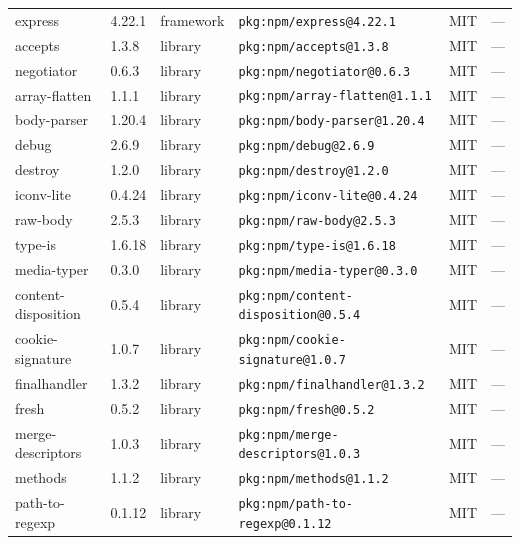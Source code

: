 \documentclass[11pt,a4paper]{article}
\begin{document}
\begin{longtable}{|p{4cm}|p{2cm}|p{1.6cm}|p{5cm}|p{1.5cm}|p{3.5cm}|}
\raggedright express & 4.22.1 & framework & \small\texttt{pkg:npm/express@4.22.1} & MIT & \small — \\
\raggedright accepts & 1.3.8 & library & \small\texttt{pkg:npm/accepts@1.3.8} & MIT & \small — \\
\raggedright negotiator & 0.6.3 & library & \small\texttt{pkg:npm/negotiator@0.6.3} & MIT & \small — \\
\raggedright array-flatten & 1.1.1 & library & \small\texttt{pkg:npm/array-flatten@1.1.1} & MIT & \small — \\
\raggedright body-parser & 1.20.4 & library & \small\texttt{pkg:npm/body-parser@1.20.4} & MIT & \small — \\
\raggedright debug & 2.6.9 & library & \small\texttt{pkg:npm/debug@2.6.9} & MIT & \small — \\
\raggedright destroy & 1.2.0 & library & \small\texttt{pkg:npm/destroy@1.2.0} & MIT & \small — \\
\raggedright iconv-lite & 0.4.24 & library & \small\texttt{pkg:npm/iconv-lite@0.4.24} & MIT & \small — \\
\raggedright raw-body & 2.5.3 & library & \small\texttt{pkg:npm/raw-body@2.5.3} & MIT & \small — \\
\raggedright type-is & 1.6.18 & library & \small\texttt{pkg:npm/type-is@1.6.18} & MIT & \small — \\
\raggedright media-typer & 0.3.0 & library & \small\texttt{pkg:npm/media-typer@0.3.0} & MIT & \small — \\
\raggedright content-disposition & 0.5.4 & library & \small\texttt{pkg:npm/content-disposition@0.5.4} & MIT & \small — \\
\raggedright cookie-signature & 1.0.7 & library & \small\texttt{pkg:npm/cookie-signature@1.0.7} & MIT & \small — \\
\raggedright finalhandler & 1.3.2 & library & \small\texttt{pkg:npm/finalhandler@1.3.2} & MIT & \small — \\
\raggedright fresh & 0.5.2 & library & \small\texttt{pkg:npm/fresh@0.5.2} & MIT & \small — \\
\raggedright merge-descriptors & 1.0.3 & library & \small\texttt{pkg:npm/merge-descriptors@1.0.3} & MIT & \small — \\
\raggedright methods & 1.1.2 & library & \small\texttt{pkg:npm/methods@1.1.2} & MIT & \small — \\
\raggedright path-to-regexp & 0.1.12 & library & \small\texttt{pkg:npm/path-to-regexp@0.1.12} & MIT & \small — \\

\end{longtable}
\end{document}
